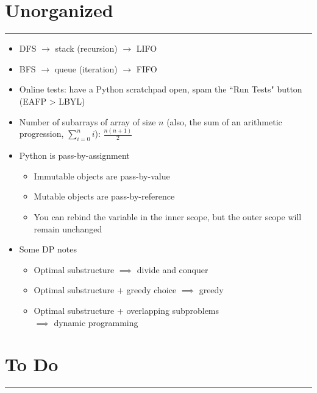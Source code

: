 \documentclass[12pt, titlepage]{article}
\begin{document}
\section{Unorganized}
\hrule\vspace{5ex}

\begin{itemize}
  \item DFS $\rightarrow$ stack (recursion) $\rightarrow$ LIFO
  \item BFS $\rightarrow$ queue (iteration) $\rightarrow$ FIFO
  \item Online tests: have a Python scratchpad open, spam the ``Run Tests" button (EAFP > LBYL)
  \item Number of subarrays of array of size $n$ (also, the sum of an arithmetic progression, $\sum_{i=0}^{n}i$): $\frac{n(n+1)}{2}$
  \item Python is pass-by-assignment
  \begin{itemize}
    \item Immutable objects are pass-by-value
    \item Mutable objects are pass-by-reference
    \item You can rebind the variable in the inner scope, but the outer scope will remain unchanged
  \end{itemize}
  \item Some DP notes
  \begin{itemize}
    \item Optimal substructure $\implies$ divide and conquer
    \item Optimal substructure + greedy choice $\implies$ greedy
    \item Optimal substructure + overlapping subproblems \\
          \-\hspace{1em}$\implies$ dynamic programming
  \end{itemize}
\end{itemize}

\section{To Do}
\hrule\vspace{5ex}
\end{document}
